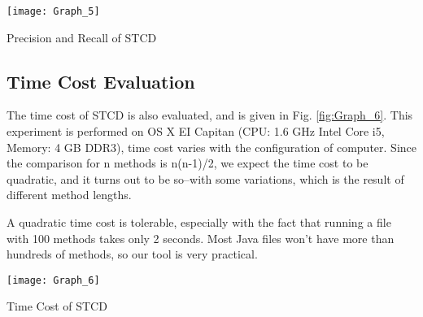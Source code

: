 \documentclass[../main.tex]{subfiles}
\begin{document}
\begin{figurehere}
\centering \texttt{[image: Graph\_5]} 
\caption{Precision and Recall of STCD} \label{fig:Graph_5}
\end{figurehere}

\subsection{Time Cost Evaluation}

The time cost of STCD is also evaluated, and is given in Fig. \ref{fig:Graph_6}. This experiment is performed on OS X EI Capitan (CPU: 1.6 GHz Intel Core i5, Memory: 4 GB DDR3), time cost varies with the configuration of computer. Since the comparison for n methods is n(n-1)/2, we expect the time cost to be quadratic, and it turns out to be so--with some variations, which is the result of different method lengths.

A quadratic time cost is tolerable, especially with the fact that running a file with 100 methods takes only 2 seconds. Most Java files won't have more than hundreds of methods, so our tool is very practical. \\

\begin{figurehere}
\centering \texttt{[image: Graph\_6]} 
\caption{Time Cost of STCD} \label{fig:Graph_6}
\end{figurehere}
\end{document}

